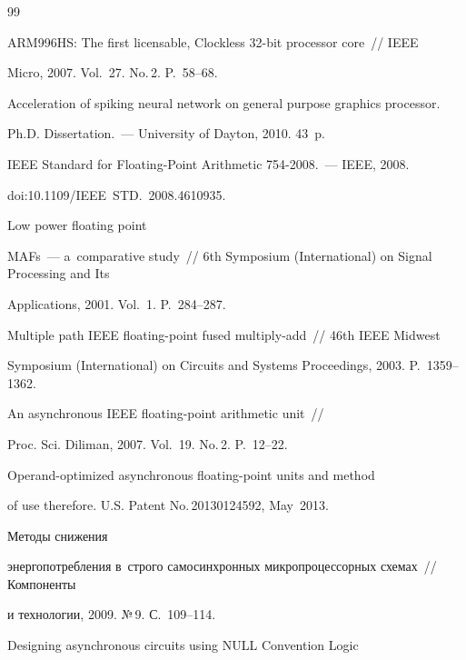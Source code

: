 {{\begin{thebibliography}{99}

 ARM996HS: The first licensable, Clockless 32-bit processor core~/\!\!/ IEEE

Micro, 2007. Vol.~27. No.\,2. P.~58--68.


 Acceleration of spiking neural network on general purpose graphics processor.

Ph.D. Dissertation.~--- University of Dayton, 2010. 43~p.


 IEEE Standard for Floating-Point Arithmetic 754-2008.~---  IEEE, 2008.

doi:10.1109/IEEE~STD.~2008.4610935.


 Low power floating point

MAFs~--- a~comparative study~/\!\!/ 6th Symposium (International) on Signal Processing and Its

Applications, 2001. Vol.~1. P.~284--287.


 Multiple path IEEE floating-point fused multiply-add~/\!\!/ 46th IEEE Midwest

Symposium (International) on Circuits and Systems Proceedings, 2003. P.~1359--1362.


 An asynchronous IEEE floating-point arithmetic unit~/\!\!/

Proc. Sci. Diliman, 2007. Vol.~19. No.\,2. P.~12--22.


 Operand-optimized asynchronous floating-point units and method

of use therefore. U.S. Patent No.\,20130124592, May~2013.


 Методы снижения

энергопотребления в~строго самосинхронных микропроцессорных схемах~/\!\!/ Компоненты

и технологии, 2009. №\,9. С.~109--114.


 Designing asynchronous circuits using NULL Convention Logic


\end{thebibliography}}}
